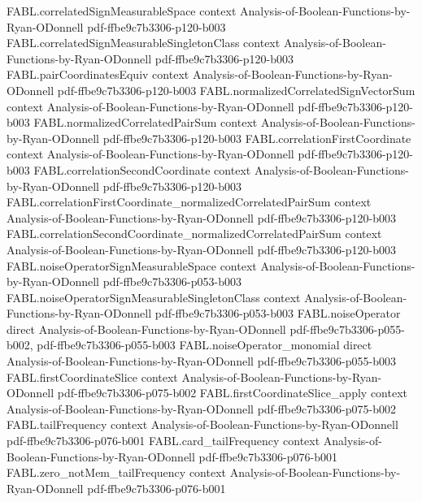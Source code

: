 \begin{theorem}
\proofstep
  {FABL.correlatedSignMeasurableSpace}
  {context}
  {Analysis-of-Boolean-Functions-by-Ryan-ODonnell}
  {pdf-ffbe9c7b3306-p120-b003}
\proofstep
  {FABL.correlatedSignMeasurableSingletonClass}
  {context}
  {Analysis-of-Boolean-Functions-by-Ryan-ODonnell}
  {pdf-ffbe9c7b3306-p120-b003}
\proofstep
  {FABL.pairCoordinatesEquiv}
  {context}
  {Analysis-of-Boolean-Functions-by-Ryan-ODonnell}
  {pdf-ffbe9c7b3306-p120-b003}
\proofstep
  {FABL.normalizedCorrelatedSignVectorSum}
  {context}
  {Analysis-of-Boolean-Functions-by-Ryan-ODonnell}
  {pdf-ffbe9c7b3306-p120-b003}
\proofstep
  {FABL.normalizedCorrelatedPairSum}
  {context}
  {Analysis-of-Boolean-Functions-by-Ryan-ODonnell}
  {pdf-ffbe9c7b3306-p120-b003}
\proofstep
  {FABL.correlationFirstCoordinate}
  {context}
  {Analysis-of-Boolean-Functions-by-Ryan-ODonnell}
  {pdf-ffbe9c7b3306-p120-b003}
\proofstep
  {FABL.correlationSecondCoordinate}
  {context}
  {Analysis-of-Boolean-Functions-by-Ryan-ODonnell}
  {pdf-ffbe9c7b3306-p120-b003}
\proofstep
  {FABL.correlationFirstCoordinate_normalizedCorrelatedPairSum}
  {context}
  {Analysis-of-Boolean-Functions-by-Ryan-ODonnell}
  {pdf-ffbe9c7b3306-p120-b003}
\proofstep
  {FABL.correlationSecondCoordinate_normalizedCorrelatedPairSum}
  {context}
  {Analysis-of-Boolean-Functions-by-Ryan-ODonnell}
  {pdf-ffbe9c7b3306-p120-b003}
\proofstep
  {FABL.noiseOperatorSignMeasurableSpace}
  {context}
  {Analysis-of-Boolean-Functions-by-Ryan-ODonnell}
  {pdf-ffbe9c7b3306-p053-b003}
\proofstep
  {FABL.noiseOperatorSignMeasurableSingletonClass}
  {context}
  {Analysis-of-Boolean-Functions-by-Ryan-ODonnell}
  {pdf-ffbe9c7b3306-p053-b003}
\proofstep
  {FABL.noiseOperator}
  {direct}
  {Analysis-of-Boolean-Functions-by-Ryan-ODonnell}
  {pdf-ffbe9c7b3306-p055-b002,
    pdf-ffbe9c7b3306-p055-b003}
\proofstep
  {FABL.noiseOperator_monomial}
  {direct}
  {Analysis-of-Boolean-Functions-by-Ryan-ODonnell}
  {pdf-ffbe9c7b3306-p055-b003}
\proofstep
  {FABL.firstCoordinateSlice}
  {context}
  {Analysis-of-Boolean-Functions-by-Ryan-ODonnell}
  {pdf-ffbe9c7b3306-p075-b002}
\proofstep
  {FABL.firstCoordinateSlice_apply}
  {context}
  {Analysis-of-Boolean-Functions-by-Ryan-ODonnell}
  {pdf-ffbe9c7b3306-p075-b002}
\proofstep
  {FABL.tailFrequency}
  {context}
  {Analysis-of-Boolean-Functions-by-Ryan-ODonnell}
  {pdf-ffbe9c7b3306-p076-b001}
\proofstep
  {FABL.card_tailFrequency}
  {context}
  {Analysis-of-Boolean-Functions-by-Ryan-ODonnell}
  {pdf-ffbe9c7b3306-p076-b001}
\proofstep
  {FABL.zero_notMem_tailFrequency}
  {context}
  {Analysis-of-Boolean-Functions-by-Ryan-ODonnell}
  {pdf-ffbe9c7b3306-p076-b001}

\end{theorem}
